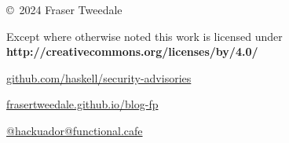 \documentclass[ignorenonframetext,aspectratio=169,12pt]{beamer}
\begin{document}

\begin{frame}[plain]
\begin{columns}

  \begin{column}{.6\textwidth}

    \setlength{\parskip}{.5em}

    { \centering

    

    \copyright~2024  Fraser Tweedale

    { \scriptsize
    Except where otherwise noted this work is licensed under
    }
    { \footnotesize
    \textbf{http://creativecommons.org/licenses/by/4.0/}
    }

    }

    \begin{description}
      \small
      \item[SRT code] \href{https://github.com/haskell/security-advisories}{github.com/haskell/security-advisories}
      \item[My blog] \href{https://frasertweedale.github.io/blog-fp/}{frasertweedale.github.io/blog-fp}
      \item[Fediverse] \href{https://functional.cafe/@hackuador}{@hackuador@functional.cafe}
    \end{description}
  \end{column}

\end{columns}
\end{frame}
\end{document}
